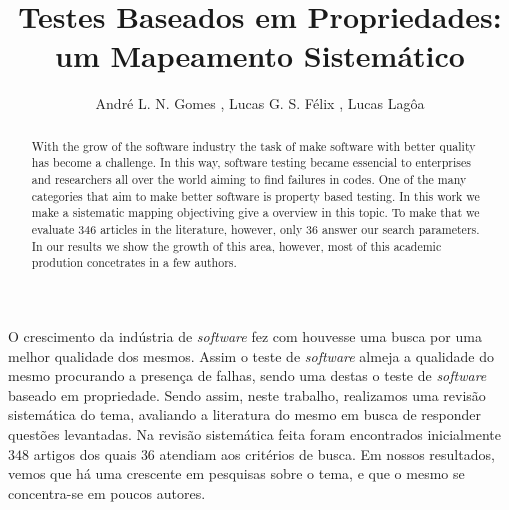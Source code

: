 \documentclass[12pt]{article}
\title{Testes Baseados em Propriedades: um Mapeamento Sistemático}
\author{André L. N. Gomes \inst{1}, Lucas G. S. Félix \inst{1}, Lucas Lagôa \inst{1}}
\begin{document}
 

\maketitle

\begin{abstract}
    With the grow of the software industry the task of make software with better quality has become a challenge. In this way, software testing became essencial to enterprises and researchers all over the world aiming to find failures in codes. One of the many categories that aim to make better software is property based testing. In this work we make a sistematic mapping objectiving give a overview in this topic. To make that we evaluate 346 articles in the literature, however, only 36 answer our search parameters. In our results we show the growth of this area, however, most of this academic prodution concetrates in a few authors.
\end{abstract}
     
\begin{resumo} 
  O crescimento da indústria de \textit{software} fez com houvesse uma busca por uma melhor qualidade dos mesmos. Assim o teste de \textit{software} almeja a qualidade do mesmo procurando a presença de falhas, sendo uma destas o teste de \textit{software} baseado em propriedade. Sendo assim, neste trabalho, realizamos uma revisão sistemática do tema, avaliando a literatura do mesmo em busca de responder questões levantadas. Na revisão sistemática feita foram encontrados inicialmente $348$ artigos dos quais $36$ atendiam aos critérios de busca. Em nossos resultados, vemos que há uma crescente em pesquisas sobre o tema, e que o mesmo se concentra-se em poucos autores.  
\end{resumo}







\newpage


\end{document}
